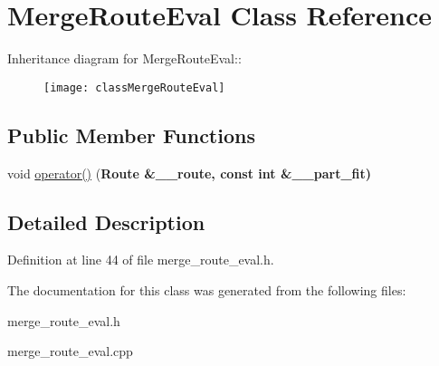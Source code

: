 \hypertarget{classMergeRouteEval}{
\section{Merge\-Route\-Eval Class Reference}
\label{classMergeRouteEval}
}
Inheritance diagram for Merge\-Route\-Eval::\begin{figure}[H]
\begin{center}
\leavevmode
\texttt{[image: classMergeRouteEval]}
\end{center}
\end{figure}
\subsection*{Public Member Functions}
\begin{CompactItemize}
\item 
\hypertarget{classMergeRouteEval_29cb0028ac0df4b2cee3a809c8f35dea}{
void \hyperlink{classMergeRouteEval_29cb0028ac0df4b2cee3a809c8f35dea}{operator()} (\bf{Route} \&\_\-\_\-route, const int \&\_\-\_\-part\_\-fit)}
\label{classMergeRouteEval_29cb0028ac0df4b2cee3a809c8f35dea}

\end{CompactItemize}


\subsection{Detailed Description}




Definition at line 44 of file merge\_\-route\_\-eval.h.

The documentation for this class was generated from the following files:\begin{CompactItemize}
\item 
merge\_\-route\_\-eval.h\item 
merge\_\-route\_\-eval.cpp\end{CompactItemize}
